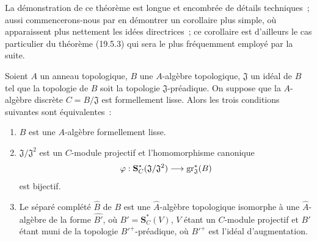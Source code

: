 La démonstration de ce théorème est longue et encombrée de détails techniques~;
aussi commencerons-nous par en démontrer un corollaire plus simple, où
apparaissent plus nettement les idées directrices~; ce corollaire est d'ailleurs
le cas particulier du théorème (19.5.3) qui sera le plus fréquemment employé
par la suite.

\begin{corollary}[19.5.4]
\label{0.19.5.4-fr}
Soient $A$ un anneau topologique, $B$ une $A$-algèbre topologique,
$\mathfrak J$ un idéal de $B$ tel que la topologie de $B$ soit la topologie
$\mathfrak J$-préadique. On suppose que la $A$-algèbre discrète
$C=B/\mathfrak J$ est formellement lisse. Alors les trois conditions suivantes
sont équivalentes~:
\begin{enumerate}
  \item[a)] $B$ est une $A$-algèbre formellement lisse.
  \item[b)] $\mathfrak J/\mathfrak J^2$ est un $C$-module projectif et
  l'homomorphisme canonique
  \[
    \varphi:\mathbf S_C^*(\mathfrak J/\mathfrak J^2)
    \longrightarrow\operatorname{gr}_{\mathfrak J}^*(B)
  \]
  est bijectif.
  \item[c)] Le séparé complété $\widehat B$ de $B$ est une
  $\widehat A$-algèbre topologique isomorphe à une $\widehat A$-algèbre de la
  forme $\widehat{B'}$, où $B'=\mathbf S_C^*(V)$, $V$ étant un $C$-module
  projectif et $B'$ étant muni de la topologie ${B'}^+$-préadique, où
  ${B'}^+$ est l'idéal d'augmentation.
\end{enumerate}
\end{corollary}


